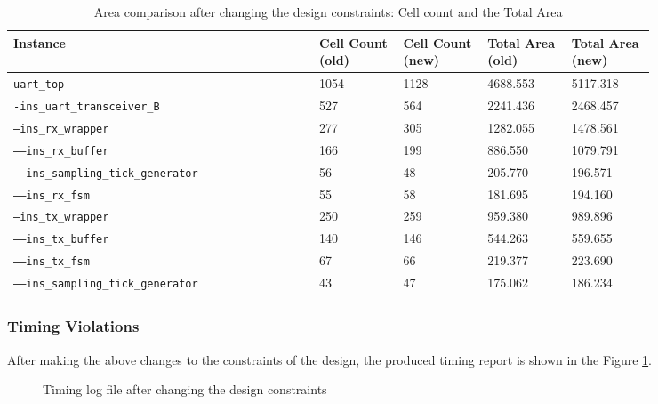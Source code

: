 \documentclass[a4paper,11pt]{article}%
\begin{document}
\begin{table}[h]
	\centering
	\caption{Area comparison after changing the design constraints: Cell count and the Total Area}
	\begin{tabular}{|L{0.4\linewidth}  |C{0.11\linewidth}  | C{0.11\linewidth}  |C{0.11\linewidth}  | C{0.11\linewidth} |} \hline
		Instance & Cell Count (old)  & Cell Count (new) & Total Area (old) & Total Area (new) \\ \hline
		{\tt uart\_top} 							 & 1054 & 1128 & 4688.553 & 5117.318\\ \hline
		{\tt -ins\_uart\_transceiver\_B} 			 &  527 &  564 & 2241.436 & 2468.457\\ \hline
		{\tt ---ins\_rx\_wrapper} 					 &  277 &  305 & 1282.055 & 1478.561\\ \hline
		{\tt -----ins\_rx\_buffer} 					 &  166 &  199 &  886.550 & 1079.791\\ \hline
		{\tt -----ins\_sampling\_tick\_generator} 	 &   56 &   48 &  205.770 &  196.571\\ \hline
		{\tt -----ins\_rx\_fsm} 					 &   55 &   58 &  181.695 &  194.160\\ \hline
		{\tt ---ins\_tx\_wrapper} 					 &  250 &  259 &  959.380 &  989.896\\ \hline
		{\tt -----ins\_tx\_buffer} 					 &  140 &  146 &  544.263 &  559.655\\ \hline
		{\tt -----ins\_tx\_fsm} 					 &   67 &   66 &  219.377 &  223.690\\ \hline
		{\tt -----ins\_sampling\_tick\_generator} 	 &   43 &   47 &  175.062 &  186.234\\ \hline		
	\end{tabular}
	\label{table:area_after_const_change}
\end{table}

\pagebreak
\subsubsection{Timing Violations}

After making the above changes to the constraints of the design, the produced timing report is shown in the Figure \ref{fig:timing_log3}.

\begin{figure}[H]
	\centering
	\caption{Timing log file after changing the design constraints}
	\label{fig:timing_log3}
\end{figure}
\end{document}
